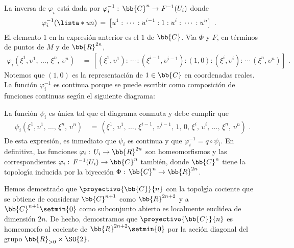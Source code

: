 \begin{ejemplo}
	La inversa de $\varphi_{i}$ est\'{a} dada por
	$\varphi_{i}^{-1}:\,\bb{C}^{n}\rightarrow F^{-1}(U_{i})$ donde
	\begin{align*}
		\varphi_{i}^{-1}(\lista*{u}{n}) & \,=\,
			\left[u^{1}:\,\cdots\,:u^{i-1}:1:u^{i}:
				\,\cdots\,:u^{n}\right]
		\text{ .}
	\end{align*}
	El elemento $1$ en la expresi\'{o}n anterior es el $1$ de $\bb{C}$.
	V\'{\i}a $\Phi$ y $F$, en t\'{e}rminos de puntos de $M$ y de
	$\bb{R}^{2n}$,
	\begin{align*}
		\varphi_{i}(\xi^{1},\upsilon^{1},\,\dots,\,
			\xi^{n},\,\upsilon^{n}) & \,=\,
			\left[(\xi^{1},\upsilon^{1}):\,\cdots\,:
			(\xi^{i-1},\upsilon^{i-1}):(1,0):
			(\xi^{i},\upsilon^{i}):\,\cdots\,
			(\xi^{n},\upsilon^{n})\right]
		\text{ .}
	\end{align*}
	Notemos que $(1,0)$ es la representaci\'{o}n de $1\in\bb{C}$ en
	coordenadas reales. La funci\'{o}n $\varphi_{i}^{-1}$ es continua
	porque se puede escribir como composici\'{o}n de funciones continuas
	seg\'{u}n el siguiente diagrama:
	\begin{center}
	\end{center}
	La funci\'{o}n $\psi_{i}$ es \'{u}nica tal que el diagrama
	conmuta y debe cumplir que
	\begin{align*}
		\psi_{i}(\xi^{1},\upsilon^{1},\,\dots,\,
			\xi^{n},\,\upsilon^{n}) & \,=\,
			(\xi^{1},\,\upsilon^{1},\,\dots,\,
			\xi^{i-1},\,\upsilon^{i-1},\,1,\,0,\,
			\xi^{i},\,\upsilon^{i},\,\dots,\,
			\xi^{n},\,\upsilon^{n})
		\text{ .}
	\end{align*}
	De esta expresi\'{o}n, es inmediato que $\psi_{i}$ es continua y que
	$\varphi_{i}^{-1}=q\circ\psi_{i}$. En definitiva, las funciones
	$\varphi_{i}:\,U_{i}\rightarrow\bb{R}^{2n}$ son homeomorfismos
	y las correspondientes
	$\varphi_{i}:\,F^{-1}(U_{i})\rightarrow\bb{C}^{n}$ tambi\'{e}n, donde
	$\bb{C}^{n}$ tiene la topolog\'{\i}a inducida por la biyecci\'{o}n
	$\Phi:\,\bb{C}^{n}\rightarrow\bb{R}^{2n}$.


	Hemos demostrado que $\proyectivo{\bb{C}}{n}$ con la topolg\'{\i}a
	cociente que se obtiene de considerar $\bb{C}^{n+1}$ como
	$\bb{R}^{2n+2}$ y a $\bb{C}^{n+1}\setmin\{0\}$ como subconjunto
	abierto es localmente euclidea de dimensi\'{o}n $2n$. De hecho,
	demostramos que $\proyectivo{\bb{C}}{n}$ es homeomorfo al
	cociente de $\bb{R}^{2n+2}\setmin\{0\}$ por la acci\'{o}n
	diagonal del grupo $\bb{R}_{>0}\times\SO{2}$.
\end{ejemplo}


